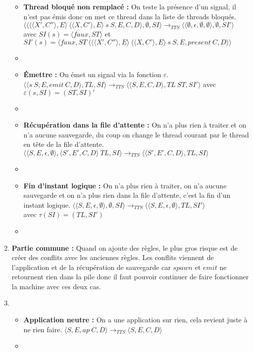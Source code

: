 \documentclass[10pt,a4paper]{report}
\begin{document}
\begin{enumerate}
\begin{itemize}
			\item[] \textbf{Thread bloqué non remplacé :} On teste la présence d'un signal, il n'est pas émis donc on met ce thread dans la liste de threads bloqués.
			\smallbreak 
			$\langle\langle \langle\langle X',C''\rangle,E\rangle~\langle\langle X,C'\rangle,E\rangle~s~S,E,C,D\rangle,\emptyset,SI\rangle 
			\longrightarrow_{TTS} 
			\langle\langle \emptyset,\epsilon,\emptyset,\emptyset\rangle,\emptyset,SI'\rangle$
			\\avec $SI(s) = \langle faux,ST\rangle$
			et $SI'(s) = \langle faux,ST~\langle\langle\langle X',C''\rangle,E\rangle~\langle\langle X,C'\rangle,E\rangle~s~S,E,present~C,D\rangle\rangle$
			\item[]
			
			\item[] \textbf{Émettre :} On émet un signal via la fonction $\varepsilon$.
			\smallbreak 
			$\langle\langle s~S,E,emit~C,D\rangle,TL,SI\rangle 
			\longrightarrow_{TTS}
			\langle\langle S,E,C,D\rangle,TL~ST,SI'\rangle$
			avec $\varepsilon(s,SI) = (ST,SI)'$
			\item[]
			
			\item[] \textbf{Récupération dans la file d'attente :} On n'a plus rien à traiter et on n'a aucune sauvegarde, du coup on change le thread courant par le thread en tête de la file d'attente.
			\smallbreak
			$\langle\langle S,E,\epsilon,\emptyset\rangle,\langle S',E',C,D\rangle~TL,SI\rangle 
			\longrightarrow_{TTS} 
			\langle\langle S',E',C,D\rangle,TL,SI\rangle$
			\item[]
			
			\item[] \textbf{Fin d'instant logique :} On n'a plus rien à traiter, on n'a aucune sauvegarde et on n'a plus rien dans la file d'attente, c'est la fin d'un instant logique.
			\smallbreak
			$\langle\langle S,E,\epsilon,\emptyset \rangle ,\emptyset,SI\rangle 
			\longrightarrow_{TTS} 
			\langle\langle S,E,\epsilon,\emptyset\rangle,TL,SI'\rangle$
			\\avec $\tau(SI) = (TL,SI')$ 
			\item[]
			
		\end{itemize}
		\item[] \textbf{Partie commune :} Quand on ajoute des règles, le plus gros risque est de créer des conflits avec les anciennes règles. Les conflits viennent de l'application et de la récupération de sauvegarde car $spawn$ et $emit$ ne retournent rien dans la pile donc il faut pouvoir continuer de faire fonctionner la machine avec ces deux cas. 
		\item[]
		\begin{itemize}
			\item[] \textbf{Application neutre :} On a une application sur rien, cela revient juste à ne rien faire.
			\smallbreak 
			$\langle S,E,ap~C,D\rangle
			\longrightarrow_{TTS} 
			\langle S,E,C,D\rangle$
			\item[]
			

\end{itemize}
\end{enumerate}
\end{document}

